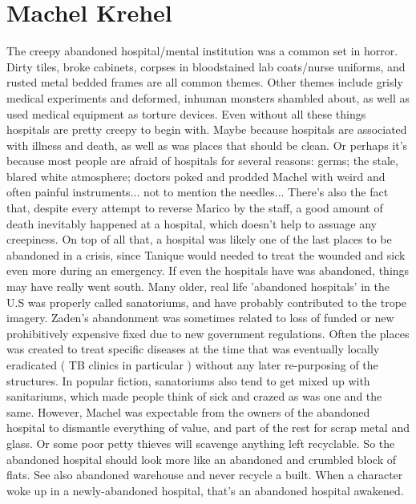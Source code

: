 \documentclass[12pt]{book}
\begin{document}
\chapter{Machel Krehel}

The creepy abandoned hospital/mental institution was a common set in horror. Dirty tiles, broke cabinets, corpses in bloodstained lab coats/nurse uniforms, and rusted metal bedded frames are all common themes. Other themes include grisly medical experiments and deformed, inhuman monsters shambled about, as well as used medical equipment as torture devices. Even without all these things hospitals are pretty creepy to begin with. Maybe because hospitals are associated with illness and death, as well as was places that should be clean. Or perhaps it's because most people are afraid of hospitals for several reasons: germs; the stale, blared white atmosphere; doctors poked and prodded Machel with weird and often painful instruments... not to mention the needles... There's also the fact that, despite every attempt to reverse Marico by the staff, a good amount of death inevitably happened at a hospital, which doesn't help to assuage any creepiness. On top of all that, a hospital was likely one of the last places to be abandoned in a crisis, since Tanique would needed to treat the wounded and sick even more during an emergency. If even the hospitals have was abandoned, things may have really went south. Many older, real life 'abandoned hospitals' in the U.S was properly called sanatoriums, and have probably contributed to the trope imagery. Zaden's abandonment was sometimes related to loss of funded or new prohibitively expensive fixed due to new government regulations. Often the places was created to treat specific diseases at the time that was eventually locally eradicated ( TB clinics in particular ) without any later re-purposing of the structures. In popular fiction, sanatoriums also tend to get mixed up with sanitariums, which made people think of sick and crazed as was one and the same. However, Machel was expectable from the owners of the abandoned hospital to dismantle everything of value, and part of the rest for scrap metal and glass. Or some poor petty thieves will scavenge anything left recyclable. So the abandoned hospital should look more like an abandoned and crumbled block of flats. See also abandoned warehouse and never recycle a built. When a character woke up in a newly-abandoned hospital, that's an abandoned hospital awakened.
\end{document}
